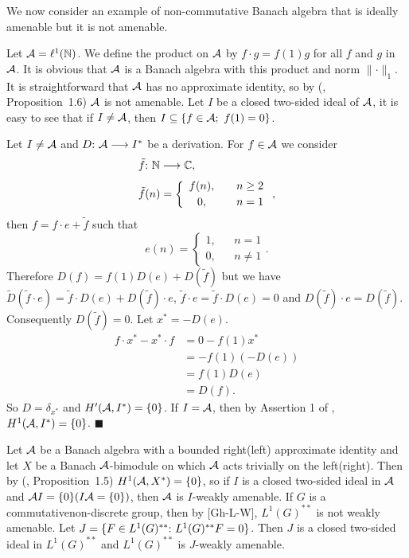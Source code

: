 \documentclass[fleqn]{mat01}
\begin{document}
We now consider an example of non-commutative Banach algebra that is
ideally amenable but it is not amenable.

\begin{exammp}
Let ${\cal A}=\ell^1(\Bbb N)$. We define the product on ${\cal A}$ by
$f\cdot g=f(1)g$ for all $f$ and $g$ in ${\cal A}$. It is obvious that
${\cal A}$ is a Banach algebra with this product and norm
$\parallel\cdot\parallel _1$. It is straightforward that ${\cal A}$ has
no approximate identity, so by (\cite{Jo1}, Proposition~1.6) ${\cal A}$
is not amenable. Let $I$ be a closed two-sided ideal of ${\cal A}$, it
is easy to see that if $I\neq {\cal A}$, then $I\subseteq \{f\in {\cal
A};~f(1)=0\}$.

Let $I\neq{\cal A}$ and $D\hbox{:}\ {\cal A}\longrightarrow I^*$ be a
derivation. For $f\in {\cal A }$ we consider
\begin{align*}
&\tilde{f}\hbox{:}\ \Bbb N\longrightarrow \Bbb C,\\[.2pc]
&\tilde{f}(n) = \left\{ \begin{array}{ccc} 
f(n), &&n\geq 2\\[.2pc]
0, &&n=1
\end{array} \right.,
\end{align*}
then $f=f\cdot e+\tilde f$ such that
\begin{equation*}
e(n) = \left\{\begin{array}{ccc}
1, &&n=1\\[.2pc]
0, && n\neq1
\end{array} \right..
\end{equation*}
Therefore $D(f)=f(1)D(e)+D(\tilde f)$ but we have $\tilde D(\tilde
f\cdot e)=\tilde f\cdot D(e)+ D(\tilde f)\cdot e$, $\tilde f \cdot
e=\tilde f\cdot D(e)=0$ and $D(\tilde f)\cdot e=D(\tilde f)$.
Consequently $D(\tilde f)=0$. Let $x^*=-D(e)$.
\begin{align*}
f\cdot x^*-x^*\cdot f &= 0-f(1)x^*\\[.2pc]
&= -f(1)(-D(e))\\[.2pc]
&= f(1)D(e)\\[.2pc]
&= D(f).
\end{align*}
So $D=\delta_{x^*}$ and $H'({\cal A},I^*)=\{0\}$. If $I=\cal A$,
then by Assertion 1 of \cite{Zh}, $H^{1}({\cal
A},I^*)=\{0\}$.\break \phantom{0} \hfill $\blacksquare$\vspace{.7pc}
\end{exammp}

 Let $\cal A$ be a Banach algebra with a bounded right(left) approximate
identity and let $X$ be a Banach $\cal A$-bimodule on which $\cal A$
acts trivially on the left(right). Then by (\cite{Jo1}, Proposition~1.5)
$H^{1}({\cal A},X^*)=\{0\}$, so if $I$ is a closed two-sided ideal in
${\cal A}$ and ${\cal A} I= \{0\} (I {\cal A}=\{0\})$, then ${\cal A}$
is $I$-weakly amenable. If $G$ is a \hbox{commutative}\break \newpage \noindent non-discrete group, then
by [Gh-L-W], $L^1(G)^{**}$ is not weakly amenable. Let $J=\{F\in
L^1(G)^{**}\hbox{:}\ L^1(G)^{**}F=0\}$. Then $J$ is a closed two-sided
ideal in $L^1(G)^{**}$ and $L^1(G)^{**}$ is $J$-weakly amenable.
\end{document}

